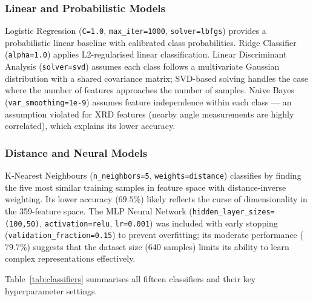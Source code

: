 \documentclass[12pt, oneside]{article} %
\begin{document}
\subsubsection{Linear and Probabilistic Models}

Logistic Regression (\texttt{C=1.0}, \texttt{max\_iter=1000}, \texttt{solver=lbfgs}) provides a probabilistic linear baseline with calibrated class probabilities. Ridge Classifier (\texttt{alpha=1.0}) applies L2-regularised linear classification. Linear Discriminant Analysis (\texttt{solver=svd}) assumes each class follows a multivariate Gaussian distribution with a shared covariance matrix; SVD-based solving handles the case where the number of features approaches the number of samples. Naive Bayes (\texttt{var\_smoothing=1e-9}) assumes feature independence within each class --- an assumption violated for XRD features (nearby angle measurements are highly correlated), which explains its lower accuracy.

\subsubsection{Distance and Neural Models}

K-Nearest Neighbours (\texttt{n\_neighbors=5}, \texttt{weights=distance}) classifies by finding the five most similar training samples in feature space with distance-inverse weighting. Its lower accuracy ($69.5\%$) likely reflects the curse of dimensionality in the 359-feature space. The MLP Neural Network (\texttt{hidden\_layer\_sizes=(100,50)}, \texttt{activation=relu}, \texttt{lr=0.001}) was included with early stopping (\texttt{validation\_fraction=0.15}) to prevent overfitting; its moderate performance ($79.7\%$) suggests that the dataset size (640 samples) limits its ability to learn complex representations effectively.

Table~\ref{tab:classifiers} summarises all fifteen classifiers and their key hyperparameter settings.
\end{document}
